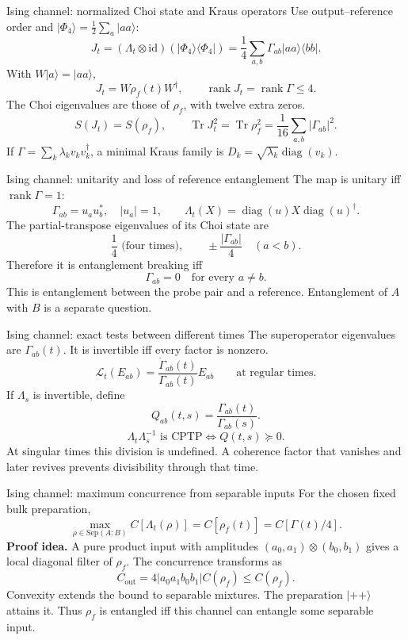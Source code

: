 \documentclass[aspectratio=169,11pt]{beamer}
\newcommand{\ket}[1]{\lvert #1\rangle}
\newcommand{\bra}[1]{\langle #1\rvert}
\newcommand{\Tr}{\operatorname{Tr}}
\newcommand{\id}{\mathrm{id}}
\newcommand{\diag}{\operatorname{diag}}
\newcommand{\rank}{\operatorname{rank}}
\begin{document}
\begin{frame}{Ising channel: normalized Choi state and Kraus operators}
\small
Use output--reference order and
$\ket{\Phi_4}=\frac12\sum_a\ket{aa}$:
\[
J_t=(\Lambda_t\otimes\id)(\ket{\Phi_4}\bra{\Phi_4})
=\frac14\sum_{a,b}\Gamma_{ab}\ket{aa}\bra{bb}.
\]
With $W\ket a=\ket{aa}$,
\[
\boxed{J_t=W\rho_f(t)W^\dagger,\qquad \rank J_t=\rank\Gamma\le4.}
\]
The Choi eigenvalues are those of $\rho_f$, with twelve extra zeros.
\[
S(J_t)=S(\rho_f),\qquad
\Tr J_t^2=\Tr\rho_f^2=\frac1{16}\sum_{a,b}|\Gamma_{ab}|^2.
\]
If $\Gamma=\sum_k\lambda_kv_kv_k^\dagger$, a minimal Kraus family is
$D_k=\sqrt{\lambda_k}\diag(v_k)$.
\end{frame}

\begin{frame}{Ising channel: unitarity and loss of reference entanglement}
The map is unitary iff $\rank\Gamma=1$:
\[
\Gamma_{ab}=u_au_b^*,\quad |u_a|=1,\qquad
\Lambda_t(X)=\diag(u)X\diag(u)^\dagger.
\]
The partial-transpose eigenvalues of its Choi state are
\[
\frac14\text{ (four times)},\qquad
\pm\frac{|\Gamma_{ab}|}{4}\quad(a<b).
\]
Therefore it is entanglement breaking iff
\[
\Gamma_{ab}=0\quad\text{for every }a\ne b.
\]
This is entanglement between the probe pair and a reference.
Entanglement of $A$ with $B$ is a separate question.
\end{frame}

\begin{frame}{Ising channel: exact tests between different times}
The superoperator eigenvalues are $\Gamma_{ab}(t)$.
It is invertible iff every factor is nonzero.
\[
\mathcal L_t(E_{ab})=\frac{\dot\Gamma_{ab}(t)}{\Gamma_{ab}(t)}E_{ab}
\qquad\text{at regular times}.
\]
If $\Lambda_s$ is invertible, define
\[
Q_{ab}(t,s)=\frac{\Gamma_{ab}(t)}{\Gamma_{ab}(s)}.
\]
\[
\boxed{\Lambda_t\Lambda_s^{-1}\text{ is CPTP}\iff Q(t,s)\succeq0.}
\]
At singular times this division is undefined. A coherence factor that
vanishes and later revives prevents divisibility through that time.
\end{frame}

\begin{frame}{Ising channel: maximum concurrence from separable inputs}
For the chosen fixed bulk preparation,
\[
\boxed{\max_{\rho\in\mathrm{Sep}(A:B)}C[\Lambda_t(\rho)]
=C[\rho_f(t)]=C[\Gamma(t)/4].}
\]
\textbf{Proof idea.} A pure product input with amplitudes
$(a_0,a_1)\otimes(b_0,b_1)$ gives a local diagonal filter of $\rho_f$.
The concurrence transforms as
\[
C_{\mathrm{out}}=4|a_0a_1b_0b_1|C(\rho_f)\le C(\rho_f).
\]
Convexity extends the bound to separable mixtures.
The preparation $\ket{++}$ attains it.
\medskip
Thus $\rho_f$ is entangled iff this channel can entangle some separable input.
\end{frame}
\end{document}
